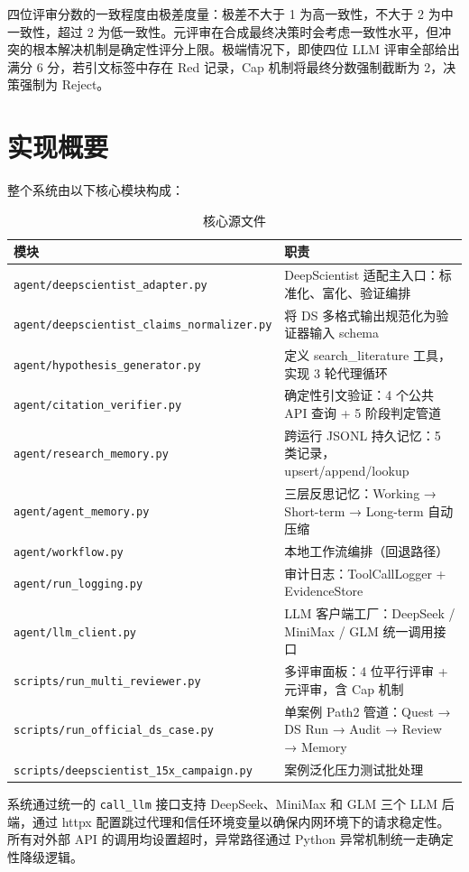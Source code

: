 \documentclass[11pt,a4paper]{ctexart}
\begin{document}
四位评审分数的一致程度由极差度量：极差不大于 1 为高一致性，不大于 2 为中一致性，超过 2 为低一致性。元评审在合成最终决策时会考虑一致性水平，但冲突的根本解决机制是确定性评分上限。极端情况下，即使四位 LLM 评审全部给出满分 6 分，若引文标签中存在 Red 记录，Cap 机制将最终分数强制截断为 2，决策强制为 Reject。

\section{实现概要}

整个系统由以下核心模块构成：

\begin{table}[htbp]
\centering
\caption{核心源文件}
\begin{tabularx}{\textwidth}{@{}l>{\raggedright\arraybackslash}X@{}}
\toprule
\textbf{模块} & \textbf{职责} \\
\midrule
\texttt{agent/deepscientist\_adapter.py} & DeepScientist 适配主入口：标准化、富化、验证编排 \\
\texttt{agent/deepscientist\_claims\_normalizer.py} & 将 DS 多格式输出规范化为验证器输入 schema \\
\texttt{agent/hypothesis\_generator.py} & 定义 search\_literature 工具，实现 3 轮代理循环 \\
\texttt{agent/citation\_verifier.py} & 确定性引文验证：4 个公共 API 查询 + 5 阶段判定管道 \\
\texttt{agent/research\_memory.py} & 跨运行 JSONL 持久记忆：5 类记录，upsert/append/lookup \\
\texttt{agent/agent\_memory.py} & 三层反思记忆：Working → Short-term → Long-term 自动压缩 \\
\texttt{agent/workflow.py} & 本地工作流编排（回退路径） \\
\texttt{agent/run\_logging.py} & 审计日志：ToolCallLogger + EvidenceStore \\
\texttt{agent/llm\_client.py} & LLM 客户端工厂：DeepSeek / MiniMax / GLM 统一调用接口 \\
\texttt{scripts/run\_multi\_reviewer.py} & 多评审面板：4 位平行评审 + 元评审，含 Cap 机制 \\
\texttt{scripts/run\_official\_ds\_case.py} & 单案例 Path2 管道：Quest → DS Run → Audit → Review → Memory \\
\texttt{scripts/deepscientist\_15x\_campaign.py} & 15 案例泛化压力测试批处理 \\
\bottomrule
\end{tabularx}
\end{table}

系统通过统一的 \texttt{call\_llm} 接口支持 DeepSeek、MiniMax 和 GLM 三个 LLM 后端，通过 httpx 配置跳过代理和信任环境变量以确保内网环境下的请求稳定性。所有对外部 API 的调用均设置超时，异常路径通过 Python 异常机制统一走确定性降级逻辑。
\end{document}
